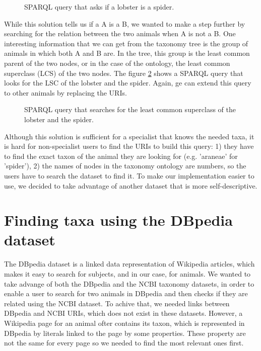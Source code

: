 \documentclass{article}
\begin{document}
\begin{figure}[h]

\caption{SPARQL query that asks if a lobster is a spider.}
\label{lst:sparql_subClassOf}
\end{figure}

While this solution tells us if a A is a B, we wanted to make a step further by searching for the relation between the two animals when A is not a B. One interesting information that we can get from the taxonomy tree is the group of animals in which both A and B are. In the tree, this group is the least common parent of the two nodes, or in the case of the ontology, the least common superclass (LCS) of the two nodes. The figure \ref{lst:sparql_lcs} shows a SPARQL query that looks for the LSC of the lobster and the spider. Again, ge can extend this query to other animals by replacing the URIs.

\begin{figure}[h]

\caption{SPARQL query that searches for the least common superclass of the lobster and the spider.}
\label{lst:sparql_lcs}
\end{figure}

Although this solution is sufficient for a specialist that knows the needed taxa, it is hard for non-specialist users to find the URIs to build this query: 1) they have to find the exact taxon of the animal they are looking for (e.g. 'araneae' for 'spider'), 2) the names of nodes in the taxonomy ontology are numbers, so the users have to search the dataset to find it. To make our implementation easier to use, we decided to take advantage of another dataset that is more self-descriptive.

\section{Finding taxa using the DBpedia dataset}

The DBpedia dataset is a linked data representation of Wikipedia articles, which makes it easy to search for subjects, and in our case, for animals. We wanted to take advange of both the DBpedia and the NCBI taxonomy datasets, in order to enable a user to search for two animals in DBpedia and then checks if they are related using the NCBI dataset. To achive that, we needed links between DBpedia and NCBI URIs, which does not exist in these datasets. However, a Wikipedia page for an animal ofter contains its taxon, which is represented in DBpedia by literals linked to the page by some properties. These property are not the same for every page so we needed to find the most relevant ones first.
\\
\end{document}

